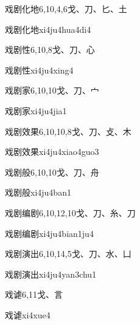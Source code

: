\begin{entry}{戏剧化地}{6,10,4,6}{⼽、⼑、⼔、⼟}
  \begin{phonetics}{戏剧化地}{xi4ju4hua4di4}
  \end{phonetics}
\end{entry}

\begin{entry}{戏剧性}{6,10,8}{⼽、⼑、⼼}
  \begin{phonetics}{戏剧性}{xi4ju4xing4}
  \end{phonetics}
\end{entry}

\begin{entry}{戏剧家}{6,10,10}{⼽、⼑、⼧}
  \begin{phonetics}{戏剧家}{xi4ju4jia1}
  \end{phonetics}
\end{entry}

\begin{entry}{戏剧效果}{6,10,10,8}{⼽、⼑、⽁、⽊}
  \begin{phonetics}{戏剧效果}{xi4ju4xiao4guo3}
  \end{phonetics}
\end{entry}

\begin{entry}{戏剧般}{6,10,10}{⼽、⼑、⾈}
  \begin{phonetics}{戏剧般}{xi4ju4ban1}
  \end{phonetics}
\end{entry}

\begin{entry}{戏剧编剧}{6,10,12,10}{⼽、⼑、⽷、⼑}
  \begin{phonetics}{戏剧编剧}{xi4ju4bian1ju4}
  \end{phonetics}
\end{entry}

\begin{entry}{戏剧演出}{6,10,14,5}{⼽、⼑、⽔、⼐}
  \begin{phonetics}{戏剧演出}{xi4ju4yan3chu1}
  \end{phonetics}
\end{entry}

\begin{entry}{戏谑}{6,11}{⼽、⾔}
  \begin{phonetics}{戏谑}{xi4xue4}
  \end{phonetics}
\end{entry}

